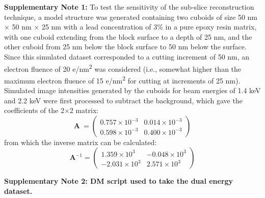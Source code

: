 \documentclass{article}
\begin{document}
\noindent\textbf{Supplementary Note 1:} To test the sensitivity of the sub-slice reconstruction technique, a model structure was generated containing two cuboids of size 50 nm × 50 nm × 25 nm with a lead concentration of 3\% in a pure epoxy resin matrix, with one cuboid extending from the block surface to a depth of 25 nm, and the other cuboid from 25 nm below the block surface to 50 nm below the surface. Since this simulated dataset corresponded to a cutting increment of 50 nm, an electron fluence of 20 e/nm\textsuperscript{2} was considered (i.e., somewhat higher than the maximum electron fluence of 15 e/nm\textsuperscript{2} for cutting at increments of 25 nm). Simulated image intensities generated by the cuboids for beam energies of 1.4 keV and 2.2 keV were first processed to subtract the background, which gave the coefficients of the 2×2 matrix:
\[
\mathbf{A}\ = \begin{pmatrix} 0.757{\times}10^{-3} & 0.014{\times}10^{-3}\\ 0.598{\times}10^{-3} & 0.400{\times}10^{-3} \end{pmatrix}
\]
from which the inverse matrix can be calculated:
\[
\mathbf{A}^{-1} = \begin{pmatrix} 1.359{\times}10^{3} & -0.048{\times}10^{3}\\ -2.031{\times}10^{3} & 2.571{\times}10^{3} \end{pmatrix}
\]

\bigskip
\noindent\textbf{Supplementary Note 2: DM script used to take the dual energy dataset.}
\end{document}
